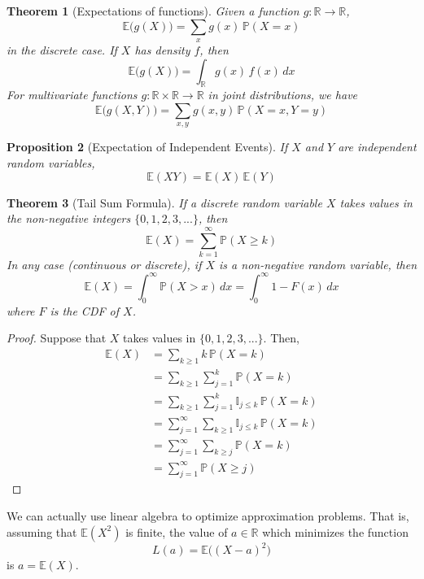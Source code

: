 \documentclass{article}
\newtheorem{theorem}{Theorem}[section]
\newtheorem{proposition}[theorem]{Proposition}
\theoremstyle{remark}
\theoremstyle{definition}
\begin{document}
\begin{theorem}[Expectations of functions]
Given a function $g: \mathbb{R} \longrightarrow \mathbb{R}$, 
\[\mathbb{E} \big( g(X) \big) = \sum_x g(x) \, \mathbb{P}(X = x)\]
in the discrete case. If $X$ has density $f$, then 
\[\mathbb{E} \big( g(X) \big) = \int_\mathbb{R} g(x) \, f(x) \, dx\]
For multivariate functions $g: \mathbb{R} \times \mathbb{R} \longrightarrow \mathbb{R}$ in joint distributions, we have
\[\mathbb{E}\big( g(X, Y) \big) = \sum_{x, y} g(x, y) \, \mathbb{P} (X=x, Y=y)\]
\end{theorem}

\begin{proposition}[Expectation of Independent Events]
If $X$ and $Y$ are independent random variables, 
\[\mathbb{E}(XY) = \mathbb{E}(X) \, \mathbb{E}(Y)\]
\end{proposition}

\begin{theorem}[Tail Sum Formula]
If a discrete random variable $X$ takes values in the non-negative integers $\{0, 1, 2, 3, ...\}$, then 
\[\mathbb{E}(X) = \sum_{k=1}^\infty \mathbb{P}(X \geq k)\]
In any case (continuous or discrete), if $X$ is a non-negative random variable, then 
\[\mathbb{E}(X) = \int_0^\infty \mathbb{P}(X > x) \, dx = \int_0^\infty 1 - F(x) \, dx\]
where $F$ is the CDF of $X$. 
\end{theorem}
\begin{proof}
Suppose that $X$ takes values in $\{0, 1, 2, 3, ...\}$. Then, 
\begin{align*}
    \mathbb{E}(X) & = \sum_{k \geq 1} k \, \mathbb{P}(X=k) \\
    & = \sum_{k\geq 1} \sum_{j=1}^k \mathbb{P}(X = k) \\
    & = \sum_{k \geq 1} \sum_{j=1}^k \mathbb{I}_{j \leq k} \, \mathbb{P}(X=k) \\
    & = \sum_{j=1}^\infty \sum_{k \geq 1} \mathbb{I}_{j \leq k} \, \mathbb{P}(X =k) \\
    & = \sum_{j=1}^\infty \sum_{k \geq j} \mathbb{P}(X=k) \\
    & = \sum_{j=1}^\infty \mathbb{P}(X \geq j)
\end{align*}
\end{proof}

We can actually use linear algebra to optimize approximation problems. That is, assuming that $\mathbb{E}(X^2)$ is finite, the value of $a\in \mathbb{R}$ which minimizes the function 
\[L(a) = \mathbb{E} \big( (X - a)^2 \big)\]
is $a = \mathbb{E}(X)$. 
\end{document}
